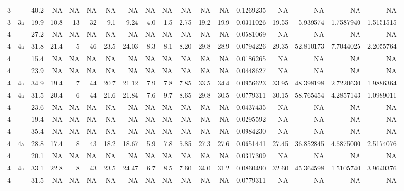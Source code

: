 \documentclass[letterpaper,9pt,twocolumn,twoside,]{pinp}
\begin{document}
\begin{longtable}[]{@{}llrrrrrrrrrrrrrrrr@{}}
3 & & 40.2 & NA & NA & NA & NA & NA & NA & NA & NA & NA & NA & 0.1269235
& NA & NA & NA & NA\tabularnewline
3 & 3a & 19.9 & 10.8 & 13 & 32 & 9.1 & 9.24 & 4.0 & 1.5 & 2.75 & 19.2 &
19.9 & 0.0311026 & 19.55 & 5.939574 & 1.7587940 &
1.5151515\tabularnewline
4 & & 27.2 & NA & NA & NA & NA & NA & NA & NA & NA & NA & NA & 0.0581069
& NA & NA & NA & NA\tabularnewline
4 & 4a & 31.8 & 21.4 & 5 & 46 & 23.5 & 24.03 & 8.3 & 8.1 & 8.20 & 29.8 &
28.9 & 0.0794226 & 29.35 & 52.810173 & 7.7044025 &
2.2055764\tabularnewline
4 & & 15.4 & NA & NA & NA & NA & NA & NA & NA & NA & NA & NA & 0.0186265
& NA & NA & NA & NA\tabularnewline
4 & & 23.9 & NA & NA & NA & NA & NA & NA & NA & NA & NA & NA & 0.0448627
& NA & NA & NA & NA\tabularnewline
4 & 4a & 34.9 & 19.4 & 7 & 44 & 20.7 & 21.12 & 7.9 & 7.8 & 7.85 & 33.5 &
34.4 & 0.0956623 & 33.95 & 48.398198 & 2.7220630 &
1.9886364\tabularnewline
4 & 4a & 31.5 & 20.4 & 6 & 44 & 21.6 & 21.84 & 7.6 & 9.7 & 8.65 & 29.8 &
30.5 & 0.0779311 & 30.15 & 58.765454 & 4.2857143 &
1.0989011\tabularnewline
4 & & 23.6 & NA & NA & NA & NA & NA & NA & NA & NA & NA & NA & 0.0437435
& NA & NA & NA & NA\tabularnewline
4 & & 19.4 & NA & NA & NA & NA & NA & NA & NA & NA & NA & NA & 0.0295592
& NA & NA & NA & NA\tabularnewline
4 & & 35.4 & NA & NA & NA & NA & NA & NA & NA & NA & NA & NA & 0.0984230
& NA & NA & NA & NA\tabularnewline
4 & 4a & 28.8 & 17.4 & 8 & 43 & 18.2 & 18.67 & 5.9 & 7.8 & 6.85 & 27.3 &
27.6 & 0.0651441 & 27.45 & 36.852845 & 4.6875000 &
2.5174076\tabularnewline
4 & & 20.1 & NA & NA & NA & NA & NA & NA & NA & NA & NA & NA & 0.0317309
& NA & NA & NA & NA\tabularnewline
4 & 4a & 33.1 & 22.8 & 8 & 43 & 23.5 & 24.47 & 6.7 & 8.5 & 7.60 & 34.0 &
31.2 & 0.0860490 & 32.60 & 45.364598 & 1.5105740 &
3.9640376\tabularnewline
4 & & 31.5 & NA & NA & NA & NA & NA & NA & NA & NA & NA & NA & 0.0779311
& NA & NA & NA & NA\tabularnewline
\bottomrule
\end{longtable}





\end{document}
